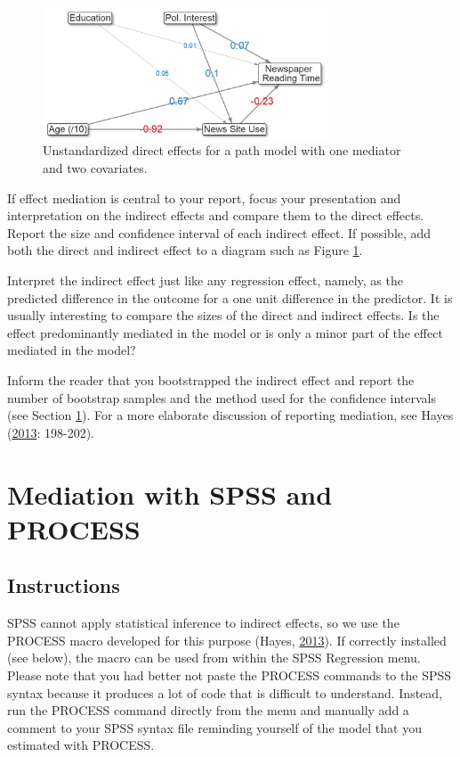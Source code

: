 \documentclass[a4paper]{book}
\theoremstyle{definition}
\theoremstyle{definition}
\theoremstyle{definition}
\theoremstyle{remark}
\begin{document}
\begin{figure}[H]
\centering
\includegraphics[width=320px]{figures/results-pathdiagram.png}
\caption{\label{fig:results-pathdiagram}Unstandardized direct effects for a
path model with one mediator and two covariates.}
\end{figure}

If effect mediation is central to your report, focus your presentation
and interpretation on the indirect effects and compare them to the
direct effects. Report the size and confidence interval of each indirect
effect. If possible, add both the direct and indirect effect to a
diagram such as Figure \ref{fig:results-pathdiagram}.

Interpret the indirect effect just like any regression effect, namely,
as the predicted difference in the outcome for a one unit difference in
the predictor. It is usually interesting to compare the sizes of the
direct and indirect effects. Is the effect predominantly mediated in the
model or is only a minor part of the effect mediated in the model?

Inform the reader that you bootstrapped the indirect effect and report
the number of bootstrap samples and the method used for the confidence
intervals (see Section \ref{SPSSPROCESS}). For a more elaborate
discussion of reporting mediation, see Hayes
(\protect\hyperlink{ref-RefWorks:3873}{2013}: 198-202).

\section{Mediation with SPSS and PROCESS}\label{SPSSPROCESS}

\subsection{Instructions}\label{instructions-10}

SPSS cannot apply statistical inference to indirect effects, so we use
the PROCESS macro developed for this purpose (Hayes,
\protect\hyperlink{ref-RefWorks:3873}{2013}). If correctly installed
(see below), the macro can be used from within the SPSS Regression menu.
Please note that you had better not paste the PROCESS commands to the
SPSS syntax because it produces a lot of code that is difficult to
understand. Instead, run the PROCESS command directly from the menu and
manually add a comment to your SPSS syntax file reminding yourself of
the model that you estimated with PROCESS.
\end{document}
